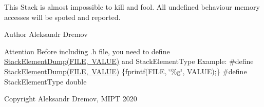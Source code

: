 This Stack is almost impossible to kill and fool. All undefined behaviour memory accesses will be spoted and reported. \begin{DoxyAuthor}{Author}
Aleksandr Dremov 
\end{DoxyAuthor}
\begin{DoxyAttention}{Attention}
Before including .h file, you need to define \mbox{\hyperlink{StackRigid_8h_a231d62549d9cfc45a003c319b7e1779e}{Stack\+Element\+Dump(\+F\+I\+L\+E, V\+A\+L\+U\+E)}} and Stack\+Element\+Type Example\+: \#define \mbox{\hyperlink{StackRigid_8h_a231d62549d9cfc45a003c319b7e1779e}{Stack\+Element\+Dump(\+F\+I\+L\+E, V\+A\+L\+U\+E)}} \{fprintf(F\+I\+LE, \char`\"{}\%g\char`\"{}, V\+A\+L\+UE);\} \#define Stack\+Element\+Type double 
\end{DoxyAttention}
\begin{DoxyCopyright}{Copyright}
Aleksandr Dremov, M\+I\+PT 2020 
\end{DoxyCopyright}

